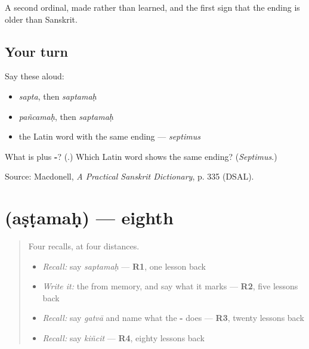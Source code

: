 \begin{grammarlens}[title={What you've built}]
A second ordinal, made rather than learned, and the first sign that the ending is older than Sanskrit.
\end{grammarlens}

\subsection*{Your turn}
Say these aloud:

\begin{itemize}
\raggedright
  \item \emph{sapta}, then \emph{saptamaḥ}
  \item \emph{pañcamaḥ}, then \emph{saptamaḥ}
  \item the Latin word with the same ending — \emph{septimus}
\end{itemize}

\begin{tcolorbox}[breakable,colback=teal!4,colframe=teal!35!black,title={Before you move on}]
What is \textbf{} plus \textbf{-}? (\textbf{}.) Which Latin word shows the same ending? (\emph{Septimus}.)

Source: Macdonell, \emph{A Practical Sanskrit Dictionary}, p. 335 (DSAL).
\end{tcolorbox}
\section[\texorpdfstring{\sk{अष्टमः} (aṣṭamaḥ)}{अष्टमः (aṣṭamaḥ)}]{ (aṣṭamaḥ) — eighth}

\label{lesson:SA-C62-eighth}



\begin{quote}
Four recalls, at four distances.

\begin{itemize}
\raggedright
  \item \emph{Recall:} say \emph{saptamaḥ} — \textbf{R1}, one lesson back
  \item \emph{Write it:} the \textbf{} from memory, and say what it marks — \textbf{R2}, five lessons back
  \item \emph{Recall:} say \emph{gatvā} and name what the \textbf{-} does — \textbf{R3}, twenty lessons back
  \item \emph{Recall:} say \emph{kiñcit} — \textbf{R4}, eighty lessons back
\end{itemize}
\end{quote}

